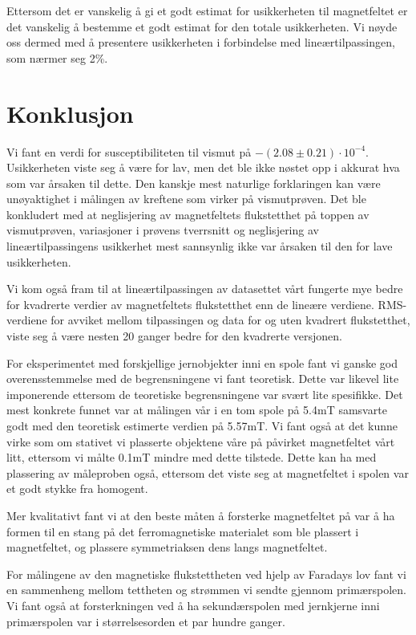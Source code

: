 \documentclass[a4paper,11pt, twocolumn]{article}
\begin{document}
Ettersom det er vanskelig å gi et godt estimat for usikkerheten til magnetfeltet er det vanskelig å bestemme et godt estimat for den totale usikkerheten. Vi nøyde oss dermed med å presentere usikkerheten i forbindelse med lineærtilpassingen, som nærmer seg 2\%. 

\section{Konklusjon}
Vi fant en verdi for susceptibiliteten til vismut på $-(2.08\pm0.21)\cdot10^{-4}$. Usikkerheten viste seg å være for lav, men det ble ikke nøstet opp i akkurat hva som var årsaken til dette. Den kanskje mest naturlige forklaringen kan være unøyaktighet i målingen av kreftene som virker på vismutprøven. Det ble konkludert med at neglisjering av magnetfeltets flukstetthet på toppen av vismutprøven, variasjoner i prøvens tverrsnitt og neglisjering av lineærtilpassingens usikkerhet mest sannsynlig ikke var årsaken til den for lave usikkerheten.

Vi kom også fram til at lineærtilpassingen av datasettet vårt fungerte mye bedre for kvadrerte verdier av magnetfeltets flukstetthet enn de lineære verdiene. RMS-verdiene for avviket mellom tilpassingen og data for og uten kvadrert flukstetthet, viste seg å være nesten 20 ganger bedre for den kvadrerte versjonen. 

For eksperimentet med forskjellige jernobjekter inni en spole fant vi ganske god overensstemmelse med de begrensningene vi fant teoretisk. Dette var likevel lite imponerende ettersom de teoretiske begrensningene var svært lite spesifikke. Det mest konkrete funnet var at målingen vår i en tom spole på 5.4mT samsvarte godt med den teoretisk estimerte verdien på 5.57mT. Vi fant også at det kunne virke som om stativet vi plasserte objektene våre på påvirket magnetfeltet vårt litt, ettersom vi målte 0.1mT mindre med dette tilstede. Dette kan ha med plassering av måleproben også, ettersom det viste seg at magnetfeltet i spolen var et godt stykke fra homogent.

Mer kvalitativt fant vi at den beste måten å forsterke magnetfeltet på var å ha formen til en stang på det ferromagnetiske materialet som ble plassert i magnetfeltet, og plassere symmetriaksen dens langs magnetfeltet.

For målingene av den magnetiske flukstettheten ved hjelp av Faradays lov fant vi en sammenheng mellom tettheten og strømmen vi sendte gjennom primærspolen. Vi fant også at forsterkningen ved å ha sekundærspolen med jernkjerne inni primærspolen var i størrelsesorden et par hundre ganger.
\end{document}
